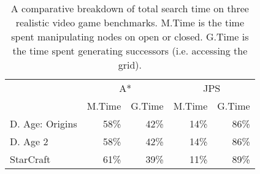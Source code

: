{\setlength{\tabcolsep}{0.5em}
\begin{table}[b!]
\vspace{-1em}
\small
\centering
\begin{tabular}{l|rr|rr}
  \hline
& \multicolumn{2}{c|}{A{*}} & \multicolumn{2}{c}{JPS} \\
& M.Time & G.Time & M.Time &  G.Time \\ \hline
D. Age: Origins & 58\% & 42\% & 14\% & 86\% \\ 
D. Age 2 & 58\% & 42\% & 14\% & 86\% \\ 
StarCraft & 61\% & 39\% & 11\% & 89\% \\ 
   \hline
\end{tabular}
\caption{\small A comparative breakdown of total search time on three realistic
video game benchmarks.
M.Time is the time spent manipulating nodes on open or closed.
G.Time is the time spent generating successors (i.e. accessing the grid).}
\label{table::bottleneck}
\end{table}
}
